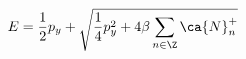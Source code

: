 \begin{equation}
E = \frac{1}{2} p_y + \sqrt{ \frac{1}{4} p_y^2
+ 4 \beta \sum_{n \in \Z} \ca{N}^+_n }
\label{betabig}
\end{equation}


